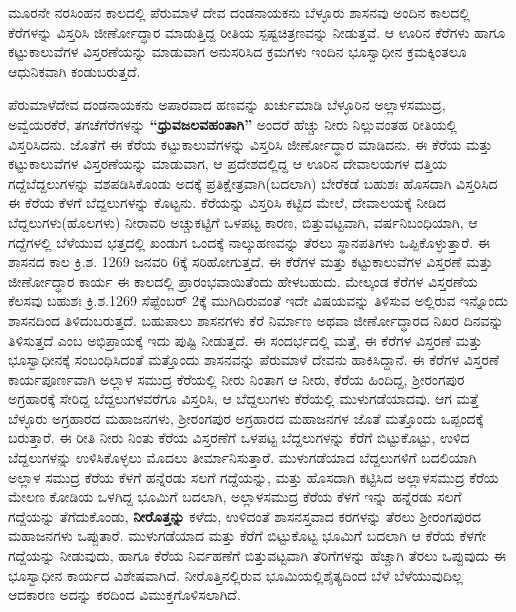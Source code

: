 ಮೂರನೇ ನರಸಿಂಹನ ಕಾಲದಲ್ಲಿ ಪೆರುಮಾಳೆ ದೇವ ದಂಡನಾಯಕನು ಬೆಳ್ಳೂರು ಶಾಸನವು ಅಂದಿನ ಕಾಲದಲ್ಲಿ ಕೆರೆಗಳನ್ನು ವಿಸ್ತರಿಸಿ ಜೀರ್ಣೋದ್ಧಾರ ಮಾಡುತ್ತಿದ್ದ ರೀತಿಯ ಸ್ಪಷ್ಟಚಿತ್ರಣವನ್ನು ನೀಡುತ್ತವೆ. ಆ ಊರಿನ ಕೆರೆಗಳು ಹಾಗೂ ಕಟ್ಟುಕಾಲುವೆಗಳ ವಿಸ್ತರಣೆಯನ್ನು ಮಾಡುವಾಗ ಅನುಸರಿಸಿದ ಕ್ರಮಗಳು ಇಂದಿನ ಭೂಸ್ವಾಧೀನ ಕ್ರಮಕ್ಕಿಂತಲೂ ಆಧುನಿಕವಾಗಿ ಕಂಡುಬರುತ್ತದೆ.

ಪೆರುಮಾಳೆದೇವ ದಂಡನಾಯಕನು ಅಪಾರವಾದ ಹಣವನ್ನು ಖರ್ಚುಮಾಡಿ ಬೆಳ್ಳೂರಿನ ಅಲ್ಲಾಳಸಮುದ್ರ, ಅವ್ವೆಯರಕೆರೆ, ತಗಚೆಗೆರೆಗಳನ್ನು \textbf{“ಧ್ರುವಜಲವಹಂತಾಗಿ”} ಅಂದರೆ ಹೆಚ್ಚು ನೀರು ನಿಲ್ಲುವಂತಹ ರೀತಿಯಲ್ಲಿ ವಿಸ್ತರಿಸಿದನು. ಜೊತೆಗೆ ಈ ಕೆರೆಯ ಕಟ್ಟುಕಾಲುವೆಗಳನ್ನು ವಿಸ್ತರಿಸಿ ಜೀರ್ಣೋದ್ಧಾರ ಮಾಡಿದನು. ಈ ಕೆರೆಯ ಮತ್ತು ಕಟ್ಟುಕಾಲುವೆಗಳ ವಿಸ್ತರಣೆಯನ್ನು ಮಾಡುವಾಗ, ಆ ಪ್ರದೇಶದಲ್ಲಿದ್ದ ಆ ಊರಿನ ದೇವಾಲಯಗಳ ದತ್ತಿಯ ಗದ್ದೆಬೆದ್ದಲುಗಳನ್ನು ವಶಪಡಿಸಿಕೊಂಡು ಅದಕ್ಕೆ ಪ್ರತಿಕ್ಷೇತ್ರವಾಗಿ(ಬದಲಾಗಿ) ಬೇರೆಕಡೆ ಬಹುಶಃ ಹೊಸದಾಗಿ ವಿಸ್ತರಿಸಿದ ಈ ಕೆರೆಯ ಕೆಳಗೆ ಬೆದ್ದಲುಗಳನ್ನು ಕೊಟ್ಟನು. ಕೆರೆಯನ್ನು ವಿಸ್ತರಿಸಿ ಕಟ್ಟಿದ ಮೇಲೆ, ದೇವಾಲಯಕ್ಕೆ ನೀಡಿದ ಬೆದ್ದಲುಗಳು(ಹೊಲಗಳು) ನೀರಾವರಿ ಅಚ್ಚುಕಟ್ಟಿಗೆ ಒಳಪಟ್ಟ ಕಾರಣ, ಬಿತ್ತುವಟ್ಟವಾಗಿ, ವರ್ಷನಿಬಂಧಿಯಾಗಿ, ಆ ಗದ್ದೆಗಳಲ್ಲಿ ಬೆಳೆಯುವ ಭತ್ತದಲ್ಲಿ ಖಂಡುಗ ಒಂದಕ್ಕೆ ನಾಲ್ಕುಹಣವನ್ನು ತೆರಲು ಸ್ಥಾನಪತಿಗಳು ಒಪ್ಪಿಕೊಳ್ಳುತ್ತಾರೆ. ಈ ಶಾಸನದ ಕಾಲ ಕ್ರಿ.ಶ. 1269 ಜನವರಿ 6ಕ್ಕೆ ಸರಿಹೋಗುತ್ತದೆ. ಈ ಕೆರೆಗಳ ಮತ್ತು ಕಟ್ಟುಕಾಲುವೆಗಳ ವಿಸ್ತರಣೆ ಮತ್ತು ಜೀರ್ಣೋದ್ಧಾರ ಕಾರ್ಯ ಈ ಕಾಲದಲ್ಲಿ ಪ್ರಾರಂಭವಾಯಿತೆಂದು ಹೇಳಬಹುದು. ಮೇಲ್ಕಂಡ ಕೆರೆಗಳ ವಿಸ್ತರಣೆಯ ಕೆಲಸವು ಬಹುಶಃ ಕ್ರಿ.ಶ.1269 ಸೆಪ್ಟೆಂಬರ್​ 2ಕ್ಕೆ ಮುಗಿದಿರುವಂತೆ ಇದೇ ವಿಷಯವನ್ನು ತಿಳಿಸುವ ಅಲ್ಲಿರುವ ಇನ್ನೊಂದು ಶಾಸನದಿಂದ ತಿಳಿದುಬರುತ್ತದೆ. ಬಹುಪಾಲು ಶಾಸನಗಳು ಕೆರೆ ನಿರ್ಮಾಣ ಅಥವಾ ಜೀರ್ಣೋದ್ಧಾರದ ನಿಖರ ದಿನವನ್ನು ತಿಳಿಸುತ್ತದೆ ಎಂಬ ಅಭಿಪ್ರಾಯಕ್ಕೆ ಇದು ಪುಷ್ಟಿ ನೀಡುತ್ತದೆ. ಈ ಸಂದರ್ಭದಲ್ಲಿ ಮತ್ತೆ, ಈ ಕೆರೆಗಳ ವಿಸ್ತರಣೆ ಮತ್ತು ಭೂಸ್ವಾಧೀನಕ್ಕೆ ಸಂಬಂಧಿಸಿದಂತೆ ಮತ್ತೊಂದು ಶಾಸನವನ್ನು ಪೆರುಮಾಳೆ ದೇವನು ಹಾಕಿಸಿದ್ದಾನೆ. ಈ ಕೆರೆಗಳ ವಿಸ್ತರಣೆ ಕಾರ್ಯಪೂರ್ಣವಾಗಿ ಅಲ್ಲಾಳ ಸಮುದ್ರ ಕೆರೆಯಲ್ಲಿ ನೀರು ನಿಂತಾಗ ಆ ನೀರು, ಕೆರೆಯ ಹಿಂದಿದ್ದ, ಶ‍್ರೀರಂಗಪುರ ಅಗ್ರಹಾರಕ್ಕೆ ಸೇರಿದ್ದ ಬೆದ್ದಲುಗಳವರೆಗೂ ವಿಸ್ತರಿಸಿ, ಆ ಬೆದ್ದಲುಗಳು ಕೆರೆಯಲ್ಲಿ ಮುಳುಗಡೆಯಾದವು. ಆಗ ಮತ್ತೆ ಬೆಳ್ಳೂರು ಅಗ್ರಹಾರದ ಮಹಾಜನಗಳು, ಶ‍್ರೀರಂಗಪುರ ಅಗ್ರಹಾರದ ಮಹಾಜನಗಳ ಜೊತೆ ಮತ್ತೊಂದು ಒಪ್ಪಂದಕ್ಕೆ ಬರುತ್ತಾರೆ. ಈ ರೀತಿ ನೀರು ನಿಂತು ಕೆರೆಯ ವಿಸ್ತರಣೆಗೆ ಒಳಪಟ್ಟ ಬೆದ್ದಲುಗಳನ್ನು ಕೆರೆಗೆ ಬಿಟ್ಟುಕೊಟ್ಟು, ಉಳಿದ ಬೆದ್ದಲುಗಳನ್ನು ಉಳಿಸಿಕೊಳ್ಳಲು ಮೊದಲು ತೀರ್ಮಾನಿಸುತ್ತಾರೆ. ಮುಳುಗಡೆಯಾದ ಬೆದ್ದಲುಗಳಿಗೆ ಬದಲಿಯಾಗಿ ಅಲ್ಲಾಳ ಸಮುದ್ರ ಕೆರೆಯ ಕೆಳಗೆ ಹನ್ನೆರಡು ಸಲಗೆ ಗದ್ದೆಯನ್ನು, ಮತ್ತು ಹೊಸದಾಗಿ ಕಟ್ಟಿಸಿದ ಅಲ್ಲಾಳಸಮುದ್ರ ಕೆರೆಯ ಮೇಲಣ ಕೋಡಿಯ ಒಳಗಿದ್ದ ಭೂಮಿಗೆ ಬದಲಾಗಿ, ಅಲ್ಲಾಳಸಮುದ್ರ ಕೆರೆಯ ಕೆಳಗೆ ಇನ್ನು ಹನ್ನೆರಡು ಸಲಗೆ ಗದ್ದೆಯನ್ನು ತೆಗೆದುಕೊಂಡು, \textbf{ನೀರೊತ್ತನ್ನು} ಕಳೆದು, ಉಳಿದಂತೆ ಶಾಸನಸ್ತವಾದ ಕರಗಳನ್ನು ತೆರಲು ಶ‍್ರೀರಂಗಪುರದ ಮಹಾಜನಗಳು ಒಪ್ಪುತಾರೆ. ಮುಳುಗಡೆಯಾದ ಮತ್ತು ಕೆರೆಗೆ ಬಿಟ್ಟುಕೊಟ್ಟ ಭೂಮಿಗೆ ಬದಲಾಗಿ ಆ ಕೆರೆಯ ಕೆಳಗೇ ಗದ್ದೆಯನ್ನು ನೀಡುವುದು, ಹಾಗೂ ಕೆರೆಯ ನಿರ್ವಹಣೆಗೆ ಬಿತ್ತುವಟ್ಟವಾಗಿ ತೆರಿಗೆಗಳನ್ನು ಹೆಚ್ಚಾಗಿ ತೆರಲು ಒಪ್ಪುವುದು ಈ ಭೂಸ್ವಾಧೀನ ಕಾರ್ಯದ ವಿಶೇಷವಾಗಿದೆ. ನೀರೊತ್ತಿನಲ್ಲಿರುವ ಭೂಮಿಯಲ್ಲಿ\break ಶೈತ್ಯದಿಂದ ಬೆಳೆ ಬೆಳೆಯುವುದಿಲ್ಲ ಆದಕಾರಣ ಅದನ್ನು ಕರದಿಂದ ವಿಮುಕ್ತಗೊಳಿಸಲಾಗಿದೆ.

